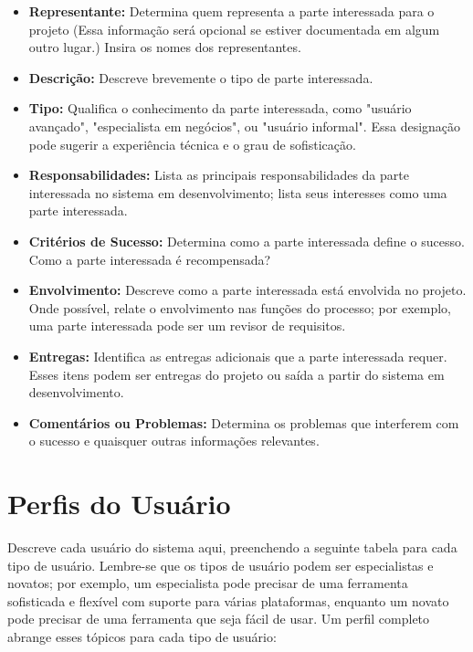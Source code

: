 \documentclass{report}
\begin{document}
\begin{itemize}

	\item
	      \textbf{Representante:} Determina quem representa a parte interessada para o
	      projeto (Essa informação será opcional se estiver documentada em algum outro
	      lugar.) Insira os nomes dos representantes.

	\item
	      \textbf{Descrição:} Descreve brevemente o tipo de parte interessada.

	\item
	      \textbf{Tipo:} Qualifica o conhecimento da parte interessada, como
	      "usuário avançado", "especialista em negócios", ou "usuário informal". Essa
	      designação pode sugerir a experiência técnica e o grau de sofisticação.

	\item
	      \textbf{Responsabilidades:} Lista as principais responsabilidades da parte
	      interessada no sistema em desenvolvimento; lista seus interesses como uma parte
	      interessada.

	\item
	      \textbf{Critérios de Sucesso:} Determina como a parte interessada define o sucesso. Como
	      a parte interessada é recompensada?

	\item
	      \textbf{Envolvimento:} Descreve como a parte interessada está envolvida no
	      projeto. Onde possível, relate o envolvimento nas funções do processo; por
	      exemplo, uma parte interessada pode ser um revisor de requisitos.

	\item
	      \textbf{Entregas:} Identifica as entregas adicionais que a parte
	      interessada requer. Esses itens podem ser entregas do projeto ou saída a partir
	      do sistema em desenvolvimento.

	\item
	      \textbf{Comentários ou Problemas:} Determina os problemas que interferem com o sucesso e
	      quaisquer outras informações relevantes.

\end{itemize}

\section{Perfis do Usuário}

Descreve cada usuário do sistema aqui, preenchendo a seguinte tabela para cada
tipo de usuário. Lembre-se que os tipos de usuário podem ser especialistas e
novatos; por exemplo, um especialista pode precisar de uma ferramenta
sofisticada e flexível com suporte para várias plataformas, enquanto um novato
pode precisar de uma ferramenta que seja fácil de usar. Um perfil completo
abrange esses tópicos para cada tipo de usuário:
\end{document}
